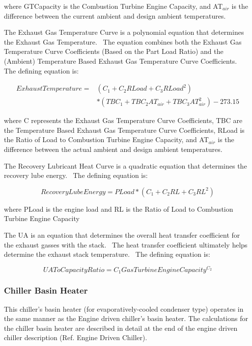 where GTCapacity is the Combustion Turbine Engine Capacity, and AT\(_{air}\) is the difference between the current ambient and design ambient temperatures.

The Exhaust Gas Temperature Curve is a polynomial equation that determines the Exhaust Gas Temperature.~ The equation combines both the Exhaust Gas Temperature Curve Coefficients (Based on the Part Load Ratio) and the (Ambient) Temperature Based Exhaust Gas Temperature Curve Coefficients.~ The defining equation is:

\begin{equation}
\begin{split}
ExhaustTemperature =& ({C_1} + {C_2}RLoad + {C_3}RLoa{d^2}) \\
&* (TB{C_1} + TB{C_2}A{T_{air}} + TB{C_3}AT_{air}^2) - 273.15
\end{split}
\end{equation}

where C represents the Exhaust Gas Temperature Curve Coefficients, TBC are the Temperature Based Exhaust Gas Temperature Curve Coefficients, RLoad is the Ratio of Load to Combustion Turbine Engine Capacity, and AT\(_{air}\) is the difference between the actual ambient and design ambient temperatures.

The Recovery Lubricant Heat Curve is a quadratic equation that determines the recovery lube energy.~ The defining equation is:

\begin{equation}
RecoveryLubeEnergy = PLoad * ({C_1} + {C_2}RL + {C_3}R{L^2})
\end{equation}

where PLoad is the engine load and RL is the Ratio of Load to Combustion Turbine Engine Capacity

The UA is an equation that determines the overall heat transfer coefficient for the exhaust gasses with the stack.~ The heat transfer coefficient ultimately helps determine the exhaust stack temperature.~ The defining equation is:

\begin{equation}
UAToCapacityRatio = {C_1}GasTurbineEngineCapacit{y^{{C_2}}}
\end{equation}

\subsubsection{Chiller Basin Heater}\label{chiller-basin-heater}

This chiller's basin heater (for evaporatively-cooled condenser type) operates in the same manner as the Engine driven chiller's basin heater. The calculations for the chiller basin heater are described in detail at the end of the engine driven chiller description (Ref. Engine Driven Chiller).

